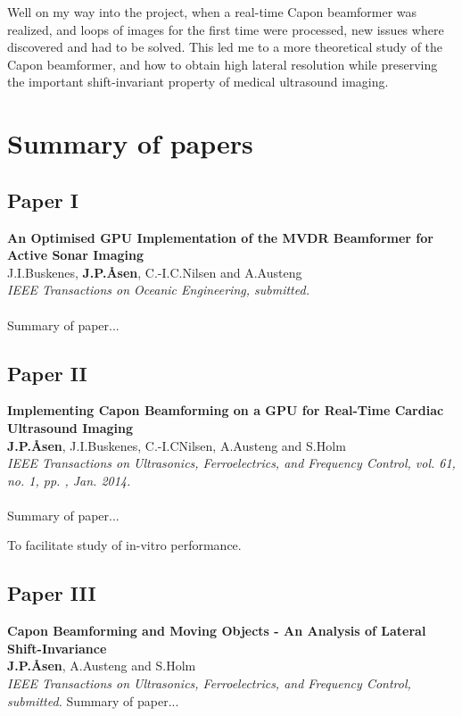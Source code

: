 Well on my way into the project, when a real-time Capon beamformer was realized, and loops of images for the first time were processed, new issues where discovered and had to be solved. This led me to a more theoretical study of the Capon beamformer, and how to obtain high lateral resolution while preserving the important shift-invariant property of medical ultrasound imaging.



\section{Summary of papers}

\subsection{Paper I}
\textbf{An Optimised GPU Implementation of the MVDR Beamformer for Active Sonar Imaging}\\
J.\:I.\:Buskenes, \textbf{J.\:P.\:\AA{}sen}, C.-I.\:C.\:Nilsen and A.\:Austeng\\
{\it IEEE Transactions on Oceanic Engineering, submitted.}\\\\
Summary of paper...

\subsection{Paper II}
\textbf{Implementing Capon Beamforming on a GPU for Real-Time Cardiac Ultrasound Imaging}\\
\textbf{J.\:P.\:\AA{}sen}, J.\:I.\:Buskenes, C.-I.\:C\:Nilsen, A.\:Austeng and S.\:Holm\\
{\it IEEE Transactions on Ultrasonics, Ferroelectrics, and Frequency Control, vol. 61, no. 1, pp. , Jan. 2014.}\\\\
Summary of paper...

To facilitate study of in-vitro performance.

\subsection{Paper III}
\textbf{Capon Beamforming and Moving Objects - An Analysis of Lateral Shift-Invariance}\\
\textbf{J.\:P.\:\AA{}sen}, A.\:Austeng and S.\:Holm\\
{\it IEEE Transactions on Ultrasonics, Ferroelectrics, and Frequency Control, submitted.}
Summary of paper...

